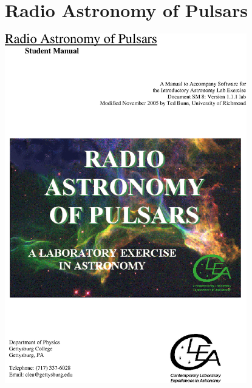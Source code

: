 \chapter{Radio Astronomy of Pulsars}

\includegraphics[height=6in,trim=-1in -3in 0 0]{wordtops/pulsar1.eps}
\vfil\eject

